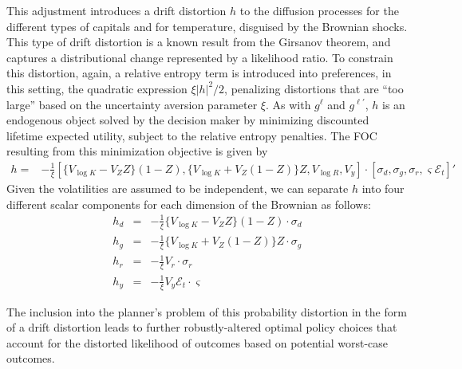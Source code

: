 \documentclass[12pt]{article}
\begin{document}
\begin{appendices}
This adjustment introduces a drift distortion $h$ to the diffusion processes for the different types of capitals and for temperature, disguised by the Brownian shocks. This type of drift distortion is a known result from the Girsanov theorem, and captures a distributional change represented by a likelihood ratio. To constrain this distortion, again, a relative entropy term is introduced into preferences, in this setting, the quadratic expression $\xi |h|^2/2$, penalizing distortions that are ``too large'' based on the uncertainty aversion parameter $\xi$. As with $g^{\ell}$ and $g^{\ell'}$, $h$ is an endogenous object solved by the decision maker by minimizing discounted lifetime expected utility, subject to the relative entropy penalties. The FOC resulting from this minimization objective is given by
\begin{align*}
h = & -\frac{1}{\xi}[\{V_{\log K}-V_{Z}Z\}(1-Z),\{V_{\log K}+V_{Z}(1-Z)\}Z,V_{\log R},V_{y}]  \cdot[\sigma_{d},\sigma_{g},\sigma_{r},\varsigma \mathcal{E}_t]'    
\end{align*}
Given the volatilities are assumed to be independent, we can separate $h$ into four different scalar components for each dimension of the Brownian as follows:
\begin{eqnarray*}
h_{d} & = & -\frac{1}{\xi}\{V_{\log K}-V_{Z}Z\}(1-Z)\cdot\sigma_{d} \\
h_{g} & = & -\frac{1}{\xi}\{V_{\log K}+V_{Z}(1-Z)\}Z\cdot\sigma_{g} \\
h_{r} & = & -\frac{1}{\xi} V_{r}\cdot\sigma_{r} \\
h_{y} & = & -\frac{1}{\xi} V_{y} \mathcal{E}_t\cdot\varsigma
\end{eqnarray*} 

The inclusion into the planner's problem of this probability distortion in the form of a drift distortion leads to further robustly-altered optimal policy choices that account for the distorted likelihood of outcomes based on potential worst-case outcomes. 


\end{appendices}
\end{document}
